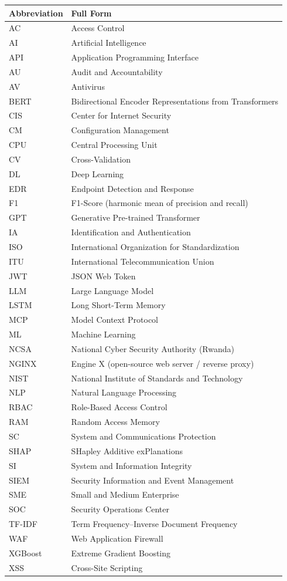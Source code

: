 \documentclass[12pt,oneside]{report}
\begin{document}
\begin{longtable}{|p{1.5in}|p{4.5in}|}
\hline
\textbf{Abbreviation} & \textbf{Full Form} \\
\hline
\endhead
AC  & Access Control \\
AI  & Artificial Intelligence \\
API & Application Programming Interface \\
AU  & Audit and Accountability \\
AV  & Antivirus \\
BERT & Bidirectional Encoder Representations from Transformers \\
CIS & Center for Internet Security \\
CM  & Configuration Management \\
CPU & Central Processing Unit \\
CV  & Cross-Validation \\
DL  & Deep Learning \\
EDR & Endpoint Detection and Response \\
F1  & F1-Score (harmonic mean of precision and recall) \\
GPT & Generative Pre-trained Transformer \\
IA  & Identification and Authentication \\
ISO & International Organization for Standardization \\
ITU & International Telecommunication Union \\
JWT & JSON Web Token \\
LLM & Large Language Model \\
LSTM & Long Short-Term Memory \\
MCP & Model Context Protocol \\
ML  & Machine Learning \\
NCSA & National Cyber Security Authority (Rwanda) \\
NGINX & Engine X (open-source web server / reverse proxy) \\
NIST & National Institute of Standards and Technology \\
NLP & Natural Language Processing \\
RBAC & Role-Based Access Control \\
RAM & Random Access Memory \\
SC  & System and Communications Protection \\
SHAP & SHapley Additive exPlanations \\
SI  & System and Information Integrity \\
SIEM & Security Information and Event Management \\
SME & Small and Medium Enterprise \\
SOC & Security Operations Center \\
TF-IDF & Term Frequency–Inverse Document Frequency \\
WAF & Web Application Firewall \\
XGBoost & Extreme Gradient Boosting \\
XSS & Cross-Site Scripting \\
\hline
\end{longtable}
\end{document}
